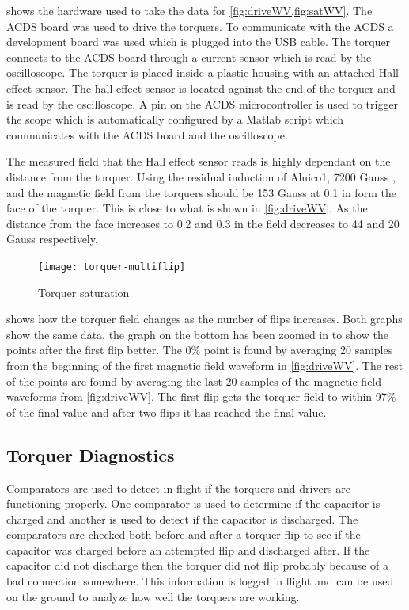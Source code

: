  shows the hardware used to take the data for \cref{fig:driveWV,fig:satWV}. The \ac{ACDS} board was used to drive the torquers. To communicate with the \ac{ACDS} a development board was used which is plugged into the \ac{USB} cable. The torquer connects to the \ac{ACDS} board through a current sensor which is read by the oscilloscope. The torquer is placed inside a plastic housing with an attached Hall effect sensor. The hall effect sensor is located against the end of the torquer and is read by the oscilloscope. A pin on the \ac{ACDS} microcontroller is  used to trigger the scope which is automatically configured by a Matlab script which communicates with the \ac{ACDS} board and the oscilloscope.

The measured field that the Hall effect sensor reads is highly dependant on the distance from the torquer. Using the residual induction of Alnico1, 7200 Gauss \cite{AlnicoProp}, and \cite{DexterField} the magnetic field from the torquers should be 153 Gauss at 0.1 in form the face of the torquer. This is close to what is shown in \cref{fig:driveWV}. As the distance from the face increases to 0.2 and 0.3 in the field decreases to 44 and 20 Gauss respectively.

\begin{figure}[H]
    \centering
    \texttt{[image: torquer-multiflip]}
    \caption{Torquer saturation}
    \label{fig:satWV}
\end{figure}

 shows how the torquer field changes as the number of flips increases. Both graphs show the same data, the graph on the bottom has been zoomed in to show the points after the first flip better. The 0\% point is found by averaging 20 samples from the beginning of the first magnetic field waveform in \cref{fig:driveWV}. The rest of the points are found by averaging the last 20 samples of the magnetic field waveforms from \cref{fig:driveWV}. The first flip gets the torquer field to within 97\% of the final value and after two flips it has reached the final value. 

\subsection{Torquer Diagnostics}

Comparators are used to detect in flight if the torquers and drivers are functioning properly. One comparator is used to determine if the capacitor is charged and another is used to detect if the capacitor is discharged. The comparators are checked both before and after a torquer flip to see if the capacitor was charged before an attempted flip and discharged after. If the capacitor did not discharge then the torquer did not flip probably because of a bad connection somewhere. This information is logged in flight and can be used on the ground to analyze how well the torquers are working.

